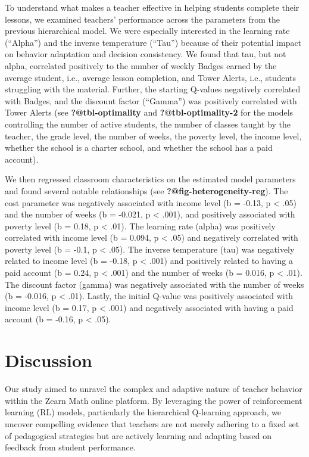 \documentclass[
  number,
  preprint,
  3p,
  onecolumn]{elsarticle}
\begin{document}
To understand what makes a teacher effective in helping students
complete their lessons, we examined teachers' performance across the
parameters from the previous hierarchical model. We were especially
interested in the learning rate (``Alpha'') and the inverse temperature
(``Tau'') because of their potential impact on behavior adaptation and
decision consistency. We found that tau, but not alpha, correlated
positively to the number of weekly Badges earned by the average student,
i.e., average lesson completion, and Tower Alerts, i.e., students
struggling with the material. Further, the starting Q-values negatively
correlated with Badges, and the discount factor (``Gamma'') was
positively correlated with Tower Alerts (see \textbf{?@tbl-optimality}
and \textbf{?@tbl-optimality-2} for the models controlling the number of
active students, the number of classes taught by the teacher, the grade
level, the number of weeks, the poverty level, the income level, whether
the school is a charter school, and whether the school has a paid
account).

We then regressed classroom characteristics on the estimated model
parameters and found several notable relationships (see
\textbf{?@fig-heterogeneity-reg}). The cost parameter was negatively
associated with income level (b = -0.13, p \textless{} .05) and the
number of weeks (b = -0.021, p \textless{} .001), and positively
associated with poverty level (b = 0.18, p \textless{} .01). The
learning rate (alpha) was positively correlated with income level (b =
0.094, p \textless{} .05) and negatively correlated with poverty level
(b = -0.1, p \textless{} .05). The inverse temperature (tau) was
negatively related to income level (b = -0.18, p \textless{} .001) and
positively related to having a paid account (b = 0.24, p \textless{}
.001) and the number of weeks (b = 0.016, p \textless{} .01). The
discount factor (gamma) was negatively associated with the number of
weeks (b = -0.016, p \textless{} .01). Lastly, the initial Q-value was
positively associated with income level (b = 0.17, p \textless{} .001)
and negatively associated with having a paid account (b = -0.16, p
\textless{} .05).

\section{Discussion}\label{discussion}

Our study aimed to unravel the complex and adaptive nature of teacher
behavior within the Zearn Math online platform. By leveraging the power
of reinforcement learning (RL) models, particularly the hierarchical
Q-learning approach, we uncover compelling evidence that teachers are
not merely adhering to a fixed set of pedagogical strategies but are
actively learning and adapting based on feedback from student
performance.
\end{document}
